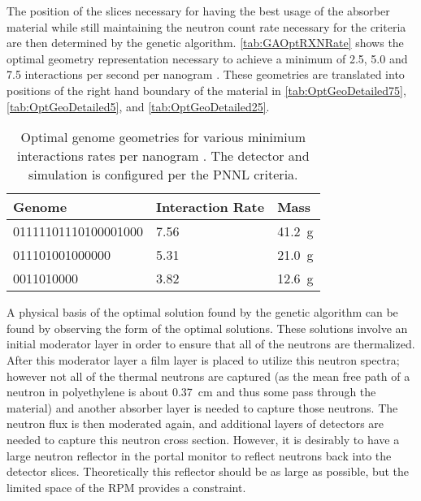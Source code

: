 The position of the slices necessary for having the best usage of the absorber material while still maintaining the neutron count rate necessary for the criteria are then determined by the genetic algorithm.
\autoref{tab:GAOptRXNRate} shows the optimal geometry representation necessary to achieve a minimum of 2.5, 5.0 and 7.5 interactions per second per nanogram .
These geometries are translated into positions of the right hand boundary of the material in \autoref{tab:OptGeoDetailed75},\autoref{tab:OptGeoDetailed5}, and \autoref{tab:OptGeoDetailed25}.
\begin{table}
	\caption[Optimal geometry for various interaction rates]{Optimal genome geometries for various minimium interactions rates per nanogram . The detector and simulation is configured per the PNNL criteria.}
	\label{tab:GAOptRXNRate}
	\begin{tabular}{m{7cm} m{5cm} m{2cm} }
	\toprule
	Genome & Interaction Rate & Mass \iso[6]{Li} \\
	\midrule
	01111101110100001000 & 7.56 & \SI{41.2}{\gram} \\
	011101001000000 & 5.31 & \SI{21.0}{\gram} \\
		0011010000 & 3.82 & \SI{12.6}{\gram} \\
	\bottomrule
	\end{tabular}
\end{table}


A physical basis of the optimal solution found by the genetic algorithm can be found by observing the form of the optimal solutions.
These solutions involve an initial moderator layer in order to ensure that all of the neutrons are thermalized.
After this moderator layer a film layer is placed to utilize this neutron spectra; however not all of the thermal neutrons are captured (as the mean free path of a neutron in polyethylene is about \SI{0.37}{\cm} and thus some pass through the material) and another absorber layer is needed to capture those neutrons.  
The neutron flux is then moderated again, and additional layers of detectors are needed to capture this neutron cross section.
However, it is desirably to have a large neutron reflector in the portal monitor to reflect neutrons back into the detector slices. 
Theoretically this reflector should be as large as possible, but the limited space of the RPM provides a constraint.

